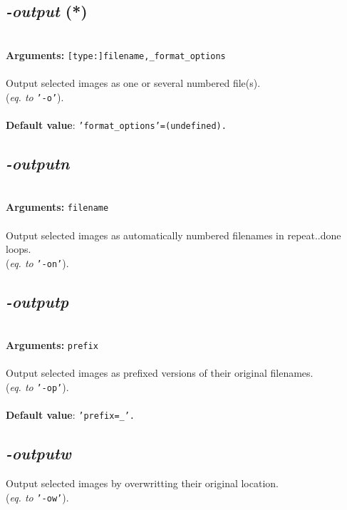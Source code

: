 \documentclass[a4paper,11pt,twoside]{book}
\begin{document}
\subsection{\emph{-output} (*)}\vspace*{-0.5em}
~\\\textbf{Arguments: } 
{\small \texttt{[type:]filename,\_format\_options}}\\~\\
Output selected images as one or several numbered file(s).
~\\(\emph{eq. to} {\small \texttt{'-o'}}).
~\\~\\\textbf{Default value}: {\small \texttt{'format\_options'=(undefined).}}


\subsection{\emph{-outputn} }\vspace*{-0.5em}
~\\\textbf{Arguments: } 
{\small \texttt{filename}}\\~\\
Output selected images as automatically numbered filenames in repeat..done loops.
~\\(\emph{eq. to} {\small \texttt{'-on'}}).


\subsection{\emph{-outputp} }\vspace*{-0.5em}
~\\\textbf{Arguments: } 
{\small \texttt{prefix}}\\~\\
Output selected images as prefixed versions of their original filenames.
~\\(\emph{eq. to} {\small \texttt{'-op'}}).
~\\~\\\textbf{Default value}: {\small \texttt{'prefix=\_'.}}


\subsection{\emph{-outputw} }\vspace*{-0.5em}
Output selected images by overwritting their original location.
~\\(\emph{eq. to} {\small \texttt{'-ow'}}).
\end{document}
